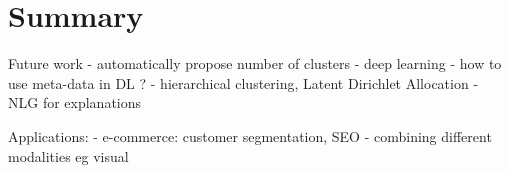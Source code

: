\documentclass[
 twocolumn,
]{ceurart}
\begin{document}
%


\section{Summary}
Future work
- automatically propose number of clusters
- deep learning - how to use meta-data in DL ?
- hierarchical clustering, Latent Dirichlet Allocation
- NLG for explanations

Applications:
- e-commerce: customer segmentation, SEO
- combining different modalities eg visual




\end{document}
